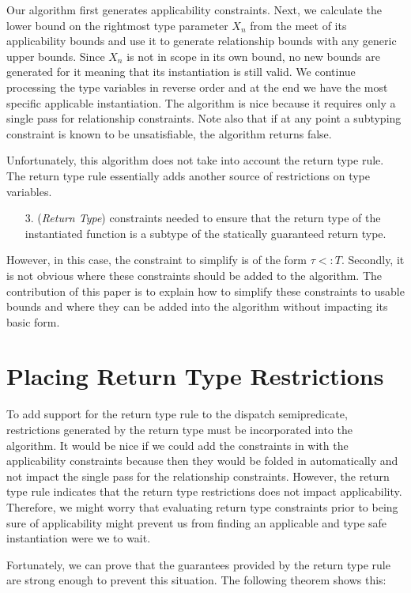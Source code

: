 \documentclass[preprint]{sigplanconf}
\begin{document}
Our algorithm first generates applicability constraints.  Next, we calculate the lower bound on the rightmost type
parameter $X_n$ from the meet of its applicability bounds and use it to generate relationship bounds with any generic upper bounds.  Since $X_n$
is not in scope in its own bound, no new bounds are generated for it meaning that its instantiation is still
valid.  We continue processing the type variables in reverse order and at the end we have the most specific
applicable instantiation.  The algorithm is nice because it requires only a single pass for relationship constraints.
Note also that if at any point a subtyping constraint is known to be unsatisfiable, the algorithm returns false.

Unfortunately, this algorithm does not take into account the return type rule.  The return type rule
essentially adds another source of restrictions on type variables.  
\begin{enumerate}
\item[3.] ({\it Return Type}) constraints needed to ensure that the return type of the instantiated function is
	a subtype of the statically guaranteed return type.
\end{enumerate}
However, in this case, the constraint
to simplify is of the form $\tau <: T$.  Secondly, it is not obvious where these constraints should be added
to the algorithm.  The contribution of this paper is to explain how to simplify these constraints to 
usable bounds and where they can be added into the algorithm without impacting its basic form.

\section{Placing Return Type Restrictions}

To add support for the return type rule to the dispatch semipredicate, restrictions generated by the return type
must be incorporated into the algorithm.  It would be nice if we could add the constraints in with the applicability
constraints because then they would be folded in automatically and not impact the single pass for the relationship
constraints.  However, the return type rule indicates that the return type restrictions does not impact applicability.
Therefore, we might worry that evaluating return type constraints prior to being sure of applicability might prevent
us from finding an applicable and type safe instantiation were we to wait.

Fortunately, we can prove that the guarantees provided by the return type rule are strong enough to prevent
this situation.  The following theorem shows this:
\end{document}
